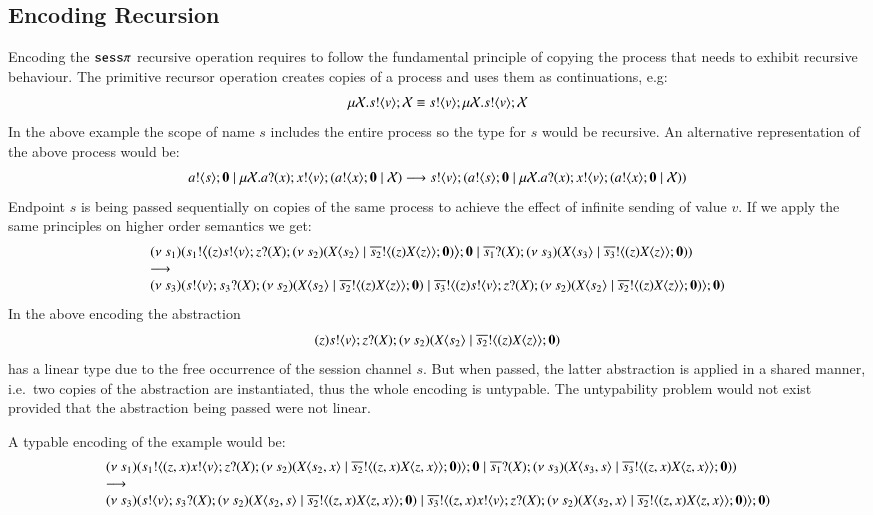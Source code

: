 \subsection{Encoding Recursion}
Encoding the $\mathtt{sess}\pi$ recursive operation requires to follow the fundamental
principle of copying the process that needs to exhibit recursive behaviour.
The primitive recursor operation creates copies of a process and uses them
as continuations, e.g:
\[
	\mu \mathcal{X}. s ! \langle v \rangle ; \mathcal{X} \equiv s ! \langle v \rangle ; \mu \mathcal{X}. s ! \langle v \rangle ; \mathcal{X}
\]
In the above example the scope of name $s$ includes the entire process so
the type for $s$ would be recursive. An alternative representation
of the above process would be:
\[
	a ! \langle s \rangle ; \mathbf{0} \;|\; \mu \mathcal{X}. a ? (x) ; x ! \langle v \rangle ; (a ! \langle x \rangle ; \mathbf{0} \;|\; \mathcal{X}) \longrightarrow s ! \langle v \rangle ; (a ! \langle s \rangle ; \mathbf{0} \;|\; \mu \mathcal{X}. a ? (x) ; x ! \langle v \rangle ; (a ! \langle x \rangle ; \mathbf{0} \;|\; \mathcal{X}))
\]
Endpoint $s$ is being passed sequentially on copies of the 
same process to achieve the effect of infinite sending of value $v$.
If we apply the same principles on higher order semantics we get:
\[
	\begin{array}{l}
	(\nu\ s_1)(s_1 ! \big\langle (z) s ! \langle v \rangle ; z ? (X) ; (\nu\ s_2)(X\langle s_2 \rangle \;|\; \overline{s_2} ! \langle (z) X\langle z \rangle  \rangle ; \mathbf{0})  \big\rangle ; \mathbf{0} \;|\; \overline{s_1} ? (X) ; (\nu\ s_3)(X\langle s_3 \rangle \;|\; \overline{s_3} ! \langle (z) X\langle z \rangle \rangle ; \mathbf{0} ) )
		\\
		\longrightarrow
		\\
		(\nu\ s_3)(s ! \langle v \rangle ; s_3 ? (X) ; (\nu\ s_2)(X\langle s_2 \rangle \;|\; \overline{s_2} ! \langle (z) X\langle z \rangle \rangle ; \mathbf{0}) \;|\; \overline{s_3} ! \langle (z) s ! \langle v \rangle ; z ? (X) ; (\nu\ s_2)(X\langle s_2 \rangle \;|\; \overline{s_2} ! \langle (z) X\langle z \rangle  \rangle ; \mathbf{0})   \rangle ; \mathbf{0} )
	\end{array}
\]
In the above encoding the abstraction
$$(z) s ! \langle v \rangle ; z ? (X) ; (\nu\ s_2)(X\langle s_2 \rangle \;|\; \overline{s_2} ! \langle (z) X\langle z \rangle  \rangle ; \mathbf{0})$$
has a linear type due to the free occurrence of the session channel $s$.
But when passed, the latter abstraction is applied in a shared manner, i.e.\ two
copies of the abstraction are instantiated, thus the whole
encoding is untypable. The untypability problem would not exist
provided that the abstraction being passed were not linear.

A typable encoding of the example would be:
\[
	\begin{array}{l}
		(\nu\ s_1)(s_1 ! \langle (z,x) x ! \langle v \rangle ; z ? (X) ; (\nu\ s_2)(X\langle s_2,x \rangle \;|\; \overline{s_2} ! \langle (z,x) X\langle z,x \rangle  \rangle ; \mathbf{0})  \rangle ; \mathbf{0} \;|\; \overline{s_1} ? (X) ; (\nu\ s_3)(X\langle s_3,s \rangle \;|\; \overline{s_3} ! \langle (z,x) X\langle z,x \rangle \rangle ; \mathbf{0} ) )
		\\
		\longrightarrow
		\\
		(\nu\ s_3)(s ! \langle v \rangle ; s_3 ? (X) ; (\nu\ s_2)(X\langle s_2, s \rangle \;|\; \overline{s_2} ! \langle (z, x) X\langle z, x \rangle \rangle ; \mathbf{0}) \;|\; \overline{s_3} ! \langle (z, x) x ! \langle v \rangle ; z ? (X) ; (\nu\ s_2)(X\langle s_2, x \rangle \;|\; \overline{s_2} ! \langle (z, x) X\langle z, x \rangle  \rangle ; \mathbf{0})   \rangle ; \mathbf{0} )
	\end{array}
\]

